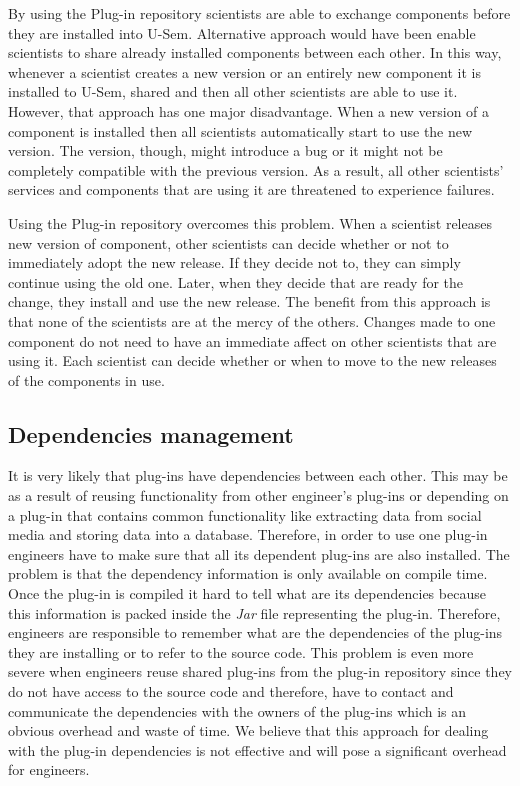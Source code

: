 By using the Plug-in repository scientists are able to exchange components before they are installed into U-Sem. Alternative approach would have been enable scientists to share already installed components between each other. In this way, whenever a scientist creates a new version or an entirely new component it is installed to U-Sem, shared and then all other scientists are able to use it. However, that approach has one major disadvantage. When a new version of a component is installed then all scientists automatically start to use the new version. The version, though, might introduce a bug or it might not be completely compatible with the previous version. As a result, all other scientists' services and components that are using it are threatened to experience failures. 

Using the Plug-in repository overcomes this problem. When a scientist releases new version of component, other scientists can decide whether or not to immediately adopt the new release. If they decide not to, they can simply continue using the old one. 
Later, when they decide that are ready for the change, they install and use the new release. The benefit from this approach is that none of the scientists are at the mercy of the others. Changes made to one component do not need to have an immediate affect on other scientists that are using it. Each scientist can decide whether or when to move to the new releases of the components in use.

\subsection{Dependencies management}

It is very likely that plug-ins have dependencies between each other. This may be as a result of reusing functionality from other engineer's plug-ins or depending on a plug-in that contains common functionality like extracting data from social media and storing data into a database. Therefore, in order to use one plug-in engineers have to make sure that all its dependent plug-ins are also installed. The problem is that the dependency information is only available on compile time. Once the plug-in is compiled it hard to tell what are its dependencies because this information is packed inside the \textit{Jar} file representing the plug-in. Therefore, engineers are responsible to remember what are the dependencies of the plug-ins they are installing or to refer to the source code. This problem is even more severe when engineers reuse shared plug-ins from the plug-in repository since they do not have access to the source code and therefore, have to contact and communicate the dependencies with the owners of the plug-ins which is an obvious overhead and waste of time. We believe that this approach for dealing with the plug-in dependencies is not effective and will pose a significant overhead for engineers.

